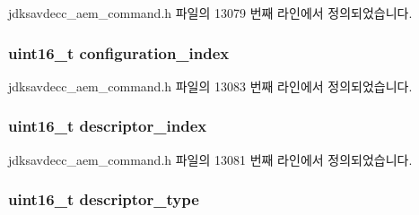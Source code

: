 jdksavdecc\+\_\+aem\+\_\+command.\+h 파일의 13079 번째 라인에서 정의되었습니다.

\subsubsection[{\texorpdfstring{configuration\+\_\+index}{configuration_index}}]{\setlength{\rightskip}{0pt plus 5cm}uint16\+\_\+t configuration\+\_\+index}\hypertarget{structjdksavdecc__aem__command__get__name_afaad1bd7c66f9611e134d8c5ce98f444}{}\label{structjdksavdecc__aem__command__get__name_afaad1bd7c66f9611e134d8c5ce98f444}


jdksavdecc\+\_\+aem\+\_\+command.\+h 파일의 13083 번째 라인에서 정의되었습니다.

\subsubsection[{\texorpdfstring{descriptor\+\_\+index}{descriptor_index}}]{\setlength{\rightskip}{0pt plus 5cm}uint16\+\_\+t descriptor\+\_\+index}\hypertarget{structjdksavdecc__aem__command__get__name_a042bbc76d835b82d27c1932431ee38d4}{}\label{structjdksavdecc__aem__command__get__name_a042bbc76d835b82d27c1932431ee38d4}


jdksavdecc\+\_\+aem\+\_\+command.\+h 파일의 13081 번째 라인에서 정의되었습니다.

\subsubsection[{\texorpdfstring{descriptor\+\_\+type}{descriptor_type}}]{\setlength{\rightskip}{0pt plus 5cm}uint16\+\_\+t descriptor\+\_\+type}\hypertarget{structjdksavdecc__aem__command__get__name_ab7c32b6c7131c13d4ea3b7ee2f09b78d}{}\label{structjdksavdecc__aem__command__get__name_ab7c32b6c7131c13d4ea3b7ee2f09b78d}


